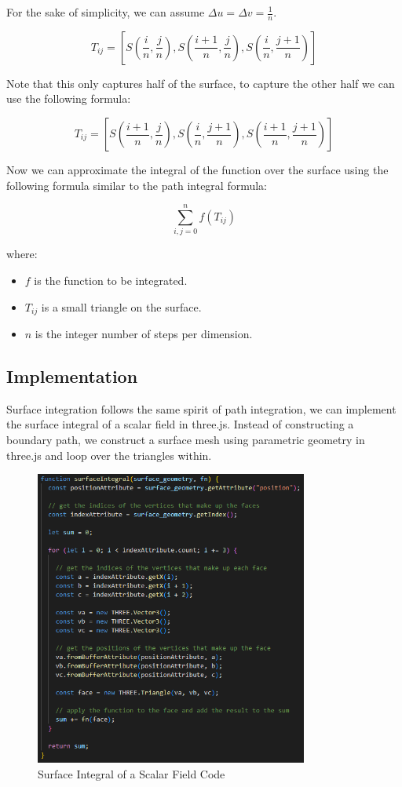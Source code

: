 \documentclass[12pt]{article}
\begin{document}
For the sake of simplicity, we can assume \(\Delta u = \Delta v = \frac{1}{n}\).

\[
    T_{ij} = \left[S\left(\frac{i}{n}, \frac{j}{n}\right), S\left(\frac{i + 1}{n}, \frac{j}{n}\right), S\left(\frac{i}{n}, \frac{j + 1}{n}\right)\right]
\]

Note that this only captures half of the surface, to capture the other half we can use the following formula:

\[
    T_{ij} = \left[S\left(\frac{i + 1}{n}, \frac{j}{n}\right), S\left(\frac{i}{n}, \frac{j + 1}{n}\right), S\left(\frac{i + 1}{n}, \frac{j + 1}{n}\right)\right]
\]

Now we can approximate the integral of the function over the surface using the following formula similar to the path integral formula:

\[
    \sum_{i, j=0}^{n} f(T_{ij})
\]

where:

\begin{itemize}
    \item \(f\) is the function to be integrated.
    \item \(T_{ij}\) is a small triangle on the surface.
    \item \(n\) is the integer number of steps per dimension.
\end{itemize}

\subsection{Implementation}

Surface integration follows the same spirit of path integration, we can implement the surface integral of a scalar field in three.js\cite{El-Deeb_PEU-218_Stokes_Threejs}.
Instead of constructing a boundary path, we construct a surface mesh using parametric geometry in three.js and loop over the triangles within.

\begin{figure}[H]
    \centering
    \includegraphics[width=0.8\textwidth]{images/surface_int.png}
    \caption{Surface Integral of a Scalar Field Code\cite{El-Deeb_PEU-218_Stokes_Threejs}}
\end{figure}
\end{document}
